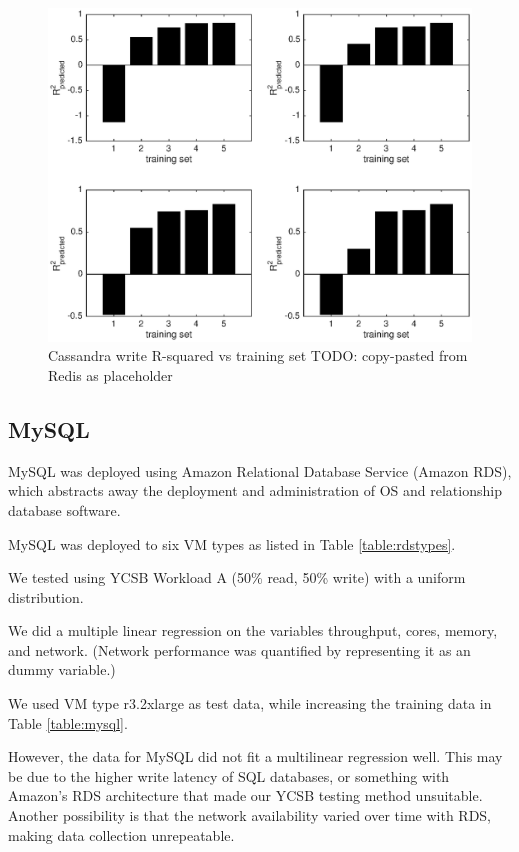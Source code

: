 \documentclass{acm_proc_article-sp}
\newcommand{\mm}[1]{{\color{red}#1}}
\begin{document}
{  \begin{figure}
    \centering
    \includegraphics[scale = 0.5]{bar_write_avg_latency.eps}
    \caption{Cassandra write R-squared vs training set TODO: copy-pasted from Redis as placeholder}
    \label{figure:redisbarread}
  \end{figure}




}
\subsection{MySQL}
\vspace{10pt}

\mm{
MySQL was deployed using Amazon Relational Database Service (Amazon RDS), which abstracts away the deployment and administration of OS and relationship database software.

MySQL was deployed to six VM types as listed in Table \ref{table:rdstypes}.

We tested using YCSB Workload A (50\% read, 50\% write) with a uniform distribution.

We did a multiple linear regression on the variables throughput, cores, memory, and network.  (Network performance was quantified by representing it as an dummy variable.)

We used VM type r3.2xlarge as test data, while increasing the training data in Table \ref{table:mysql}.

However, the data for MySQL did not fit a multilinear regression well.  This may be due to the higher write latency of SQL databases, or something with Amazon's RDS architecture that made our YCSB testing method unsuitable.  Another possibility is that the network availability varied over time with RDS, making data collection unrepeatable.
}
\end{document}
